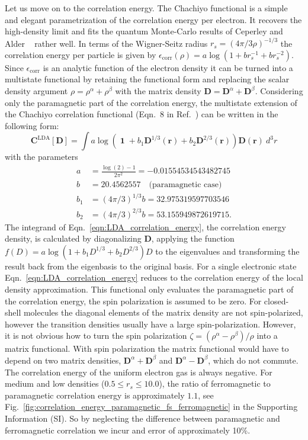 \documentclass[journal=jpclcd,manuscript=letter]{achemso}
\DeclareMathOperator{\Id}{\mathbf{1}}
\newcommand\m[1]{\mathbf{#1}}
\renewcommand\vec[1]{\mathbf{#1}}
\begin{document}
Let us move on to the correlation energy.
The Chachiyo functional \cite{Chachiyo2016} is a simple and elegant parametrization of the correlation energy per electron.
It recovers the high-density limit and fits the quantum Monte-Carlo results of Ceperley and Alder ~\cite{Ceperley1980} rather well.
In terms of the Wigner-Seitz radius $r_s=\left(4 \pi /3 \rho\right)^{-1/3}$ the correlation energy per particle is given
by $\epsilon_{\text{corr}}(\rho) = a \log(1 + b r_s^{-1} + b r_s^{-2})$. Since $\epsilon_{\text{corr}}$ is an analytic function of the electron density
it can be turned into a multistate functional by retaining the
functional form and replacing the scalar density argument $\rho=\rho^{\alpha}+\rho^{\beta}$
with the matrix density $\m{D}=\m{D}^{\alpha}+\m{D}^{\beta}$. Considering only the paramagnetic part of the correlation energy,
the multistate extension of the Chachiyo correlation functional (Eqn.~8 in Ref.~\cite{Chachiyo2016}) can be written in the following form:
\begin{equation}
 \m{C}^{\text{LDA}}[\m{D}] = \int a \log\left( \Id + b_1 \m{D}^{1/3}(\vec{r}) + b_2 \m{D}^{2/3}(\vec{r}) \right) \m{D}(\vec{r}) ~ d^3r
 \label{eqn:LDA_correlation_energy}
\end{equation}
with the parameters
\begin{align}
 a &= \frac{\log(2)-1}{2 \pi^2} = -0.01554534543482745 \\
 b &= 20.4562557 \quad \text{(paramagnetic case)} \\
 b_1 &= \left(4 \pi /3 \right)^{1/3} b = 32.975319597703546 \\
 b_2 &= \left(4 \pi /3 \right)^{2/3} b = 53.155949872619715.
\end{align}
The integrand of Eqn.~\ref{eqn:LDA_correlation_energy}, the correlation energy density,
is calculated by diagonalizing $\m{D}$,
applying the function $f(D) = a \log(1 + b_1 D^{1/3} + b_2 D^{2/3}) D$ to the eigenvalues
and transforming the result back from the eigenbasis to the original basis.
For a single electronic state Eqn.~\ref{eqn:LDA_correlation_energy} reduces to the correlation energy
of the local density approximation.
This functional only evaluates the paramagnetic part of the correlation
energy, the spin polarization is assumed to be zero.
For closed-shell molecules the diagonal elements of the matrix density are not spin-polarized, however
the transition densities usually have a large spin-polarization. However, it is not obvious how to turn the spin
polarization $\zeta = (\rho^{\alpha} - \rho^{\beta})/\rho$ into a matrix functional. With spin polarization the
matrix functional would have to depend on two matrix densities, $\m{D}^{\alpha}+\m{D}^{\beta}$ and $\m{D}^{\alpha}-\m{D}^{\beta}$,
which do not commute.
The correlation energy of the uniform electron gas is always negative. For medium
and low densities ($0.5 \leq r_s \leq 10.0$), the ratio of ferromagnetic to paramagnetic
correlation energy is approximately $1.1$, see Fig.~\ref{fig:correlation_energy_paramagnetic_fs_ferromagnetic} in the Supporting Information (SI).
So by neglecting the difference between paramagnetic and ferromagnetic correlation
we incur and error of approximately 10\%.
\end{document}
